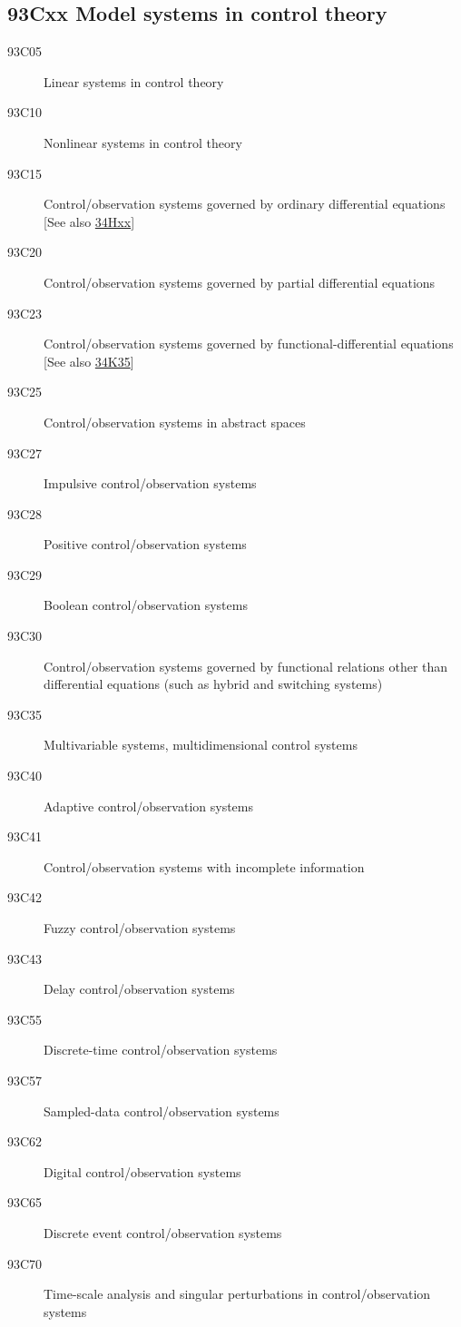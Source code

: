 \subsection*{93Cxx  Model systems in control theory}\label{93Cxx}
\begin{description}  
\item [93C05]\label{93C05} Linear systems in control theory
\item [93C10]\label{93C10} Nonlinear systems in control theory
\item [93C15]\label{93C15} Control/observation systems governed by ordinary differential equations [See also \hyperref[34Hxx]{34Hxx}]
\item [93C20]\label{93C20} Control/observation systems governed by partial differential equations
\item [93C23]\label{93C23} Control/observation systems governed by functional-differential equations [See also \hyperref[34K35]{34K35}]
\item [93C25]\label{93C25} Control/observation systems in abstract spaces
\item [93C27]\label{93C27} Impulsive control/observation systems
\item [93C28]\label{93C28} Positive control/observation systems
\item [93C29]\label{93C29} Boolean control/observation systems
\item [93C30]\label{93C30} Control/observation systems governed by functional relations other than differential equations (such as hybrid and switching systems)
\item [93C35]\label{93C35} Multivariable systems, multidimensional control systems
\item [93C40]\label{93C40} Adaptive control/observation systems
\item [93C41]\label{93C41} Control/observation systems with incomplete information
\item [93C42]\label{93C42} Fuzzy control/observation systems
\item [93C43]\label{93C43} Delay control/observation systems
\item [93C55]\label{93C55} Discrete-time control/observation systems
\item [93C57]\label{93C57} Sampled-data control/observation systems
\item [93C62]\label{93C62} Digital control/observation systems
\item [93C65]\label{93C65} Discrete event control/observation  systems
\item [93C70]\label{93C70} Time-scale analysis and singular perturbations in control/observation systems

\end{description}
